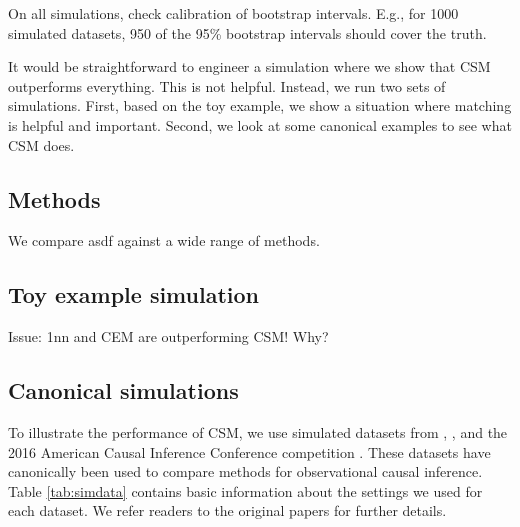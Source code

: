 \documentclass{article}
\newcommand{\note}[1]{\textcolor{red}{\textit{#1}}}
\begin{document}
On all simulations, check calibration of bootstrap intervals.
E.g., for 1000 simulated datasets, 950 of the 95\% bootstrap intervals should cover the truth.



It would be straightforward to engineer a simulation where we show that CSM outperforms everything.
This is not helpful.
Instead, we run two sets of simulations.
First, based on the toy example, we show a situation where matching is helpful and important.
Second, we look at some canonical examples to see what CSM does.

\subsection{Methods}

We compare asdf against a wide range of methods.


\subsection{Toy example simulation}


Issue: 1nn and CEM are outperforming CSM! Why?

\subsection{Canonical simulations}

To illustrate the performance of CSM, we use simulated datasets from \citet{kang2007demystifying}, \citet{hainmueller2012entropy}, and the 2016 American Causal Inference Conference competition \citep{dorie2019automated}.
These datasets have canonically been used to compare methods for observational causal inference.
Table \ref{tab:simdata} contains basic information about the settings we used for each dataset.
We refer readers to the original papers for further details.
\end{document}
